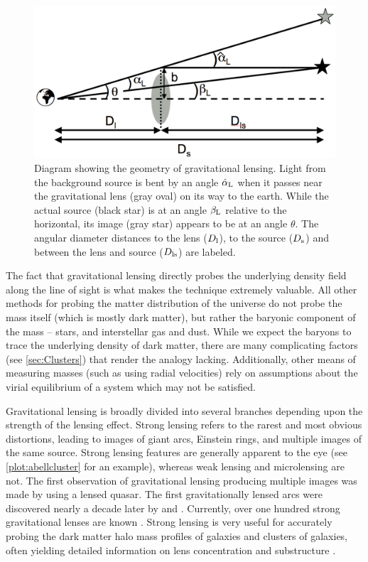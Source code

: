 \begin{figure}
\begin{center}
\includegraphics[scale=0.4]{plots_intro/LensDiagram.png}
\caption[Gravitational Lensing Diagram]{Diagram showing the geometry of gravitational lensing. Light from the background source is bent by an angle $\hat{\alpha}_{\rm L}$ when it passes near the gravitational lens (gray oval) on its way to the earth. While the actual source (black star) is at an angle $\beta_{\rm L}$ relative to the horizontal, its image (gray star) appears to be at an angle $\theta$. The angular diameter distances to the lens ($D_{\rm l}$), to the source ($D_{\rm s}$) and between the lens and source ($D_{\rm ls}$) are labeled.}
\label{plot:lensing}
\end{center}
\end{figure}

The fact that gravitational lensing directly probes the underlying density field along the line of sight is what makes the technique extremely valuable. All other methods for probing the matter distribution of the universe do not probe the mass itself (which is mostly dark matter), but rather the baryonic component of the mass -- stars, and interstellar gas and dust. While we expect the baryons to trace the underlying density of dark matter, there are many complicating factors (see \autoref{sec:Clusters}) that render the analogy lacking. Additionally, other means of measuring masses (such as using radial velocities) rely on assumptions about the virial equilibrium of a system which may not be satisfied.

Gravitational lensing is broadly divided into several branches depending upon the strength of the lensing effect. Strong lensing refers to the rarest and most obvious distortions, leading to images of giant arcs, Einstein rings, and multiple images of the same source. Strong lensing features are generally apparent to the eye (see \autoref{plot:abellcluster} for an example), whereas weak lensing and microlensing are not. The first observation of gravitational lensing producing multiple images was made by \citet{Walsh79} using a lensed quasar. The first gravitationally lensed arcs were discovered nearly a decade later by \citet{Lynds86} and \citet{Soucail87,Soucail88}. Currently, over one hundred strong gravitational lenses are known \citep{Browne03,Bolton08}. Strong lensing is very useful for accurately probing the dark matter halo mass profiles of galaxies and clusters of galaxies, often yielding detailed information on lens concentration \citep{Auger10} and substructure \citep{Mao98,Dalal02}. 

